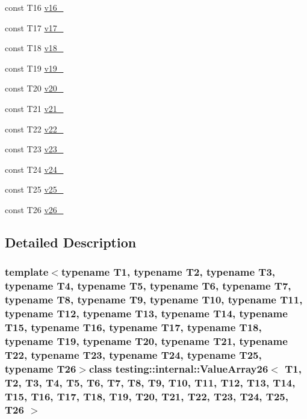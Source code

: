 \begin{DoxyCompactItemize}
\item 
const \-T16 \hyperlink{classtesting_1_1internal_1_1ValueArray26_a8b2b80d31925c1583c3e694d2bf235c5}{v16\-\_\-}
\item 
const \-T17 \hyperlink{classtesting_1_1internal_1_1ValueArray26_a9f59ea9e6f3642f77227dd1f7882d649}{v17\-\_\-}
\item 
const \-T18 \hyperlink{classtesting_1_1internal_1_1ValueArray26_ad07972ee98135c8deb090fc891a04e3e}{v18\-\_\-}
\item 
const \-T19 \hyperlink{classtesting_1_1internal_1_1ValueArray26_a3ad77b5b43c14332dabc9d47c8907e7f}{v19\-\_\-}
\item 
const \-T20 \hyperlink{classtesting_1_1internal_1_1ValueArray26_adb43992f7b5f5f07e0187003b8c9c872}{v20\-\_\-}
\item 
const \-T21 \hyperlink{classtesting_1_1internal_1_1ValueArray26_a80089b2eaa99efb5d3559378fbdac426}{v21\-\_\-}
\item 
const \-T22 \hyperlink{classtesting_1_1internal_1_1ValueArray26_aeec4c711a4f7cf166e6a2646aa7d0bc7}{v22\-\_\-}
\item 
const \-T23 \hyperlink{classtesting_1_1internal_1_1ValueArray26_a7f672a4a694f749a8b6119bff7705a66}{v23\-\_\-}
\item 
const \-T24 \hyperlink{classtesting_1_1internal_1_1ValueArray26_a6c10a180ac97815f7d3f4522507e91ca}{v24\-\_\-}
\item 
const \-T25 \hyperlink{classtesting_1_1internal_1_1ValueArray26_a26cfe8143447970e30441924be04bf08}{v25\-\_\-}
\item 
const \-T26 \hyperlink{classtesting_1_1internal_1_1ValueArray26_a26c3ac1aaf85c25e014a5001cfecb4c5}{v26\-\_\-}
\end{DoxyCompactItemize}


\subsection{\-Detailed \-Description}
\subsubsection*{template$<$typename T1, typename T2, typename T3, typename T4, typename T5, typename T6, typename T7, typename T8, typename T9, typename T10, typename T11, typename T12, typename T13, typename T14, typename T15, typename T16, typename T17, typename T18, typename T19, typename T20, typename T21, typename T22, typename T23, typename T24, typename T25, typename T26$>$class testing\-::internal\-::\-Value\-Array26$<$ T1, T2, T3, T4, T5, T6, T7, T8, T9, T10, T11, T12, T13, T14, T15, T16, T17, T18, T19, T20, T21, T22, T23, T24, T25, T26 $>$}



